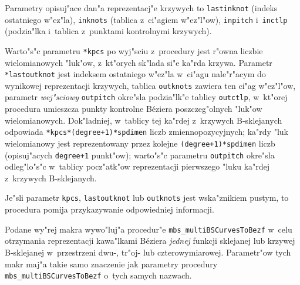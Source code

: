 Parametry opisuj"ace dan"a reprezentacj"e krzywych to \texttt{lastinknot}
(indeks ostatniego w"ez"la), \texttt{inknots} (tablica z~ci"agiem w"ez"l"ow),
\texttt{inpitch} i~\texttt{inctlp} (podzia"lka i~tablica z~punktami
kontrolnymi krzywych).

Warto"s"c parametru \texttt{*kpcs} po wyj"sciu z~procedury jest r"owna
liczbie wielomianowych "luk"ow, z~kt"orych sk"lada si"e ka"rda krzywa.
Parametr \texttt{*lastoutknot} jest indeksem ostatniego w"ez"la w~ci"agu
nale"r"acym do wynikowej reprezentacji krzywych, tablica \texttt{outknots}
zawiera ten ci"ag w"ez"l"ow, parametr \emph{wej"sciowy} \texttt{outpitch}
okre"sla podzia"lk"e tablicy \texttt{outctlp}, w~kt"orej procedura umieszcza
punkty kontrolne B\'{e}ziera poszczeg"olnych "luk"ow wielomianowych.
Dok"ladniej, w~tablicy tej ka"rdej z~krzywych B-sklejanych odpowiada
\texttt{*kpcs*(degree+1)*spdimen} liczb zmiennopozycyjnych; ka"rdy "luk
wielomianowy jest reprezentowany przez kolejne \texttt{(degree+1)*spdimen}
liczb (opisuj"acych \texttt{degree+1} punkt"ow); warto"s"c parametru
\texttt{outpitch} okre"sla odleg"lo"s"c w~tablicy pocz"atk"ow reprezentacji
pierwszego "luku ka"rdej z~krzywych B-sklejanych.

Je"sli parametr \texttt{kpcs}, \texttt{lastoutknot} lub \texttt{outknots}
jest wska"znikiem pustym, to procedura pomija przykazywanie odpowiedniej
informacji.


\vspace{\bigskipamount}
\begin{sloppypar}
Podane wy"rej makra wywo"luj"a procedur"e \texttt{mbs\_multiBSCurvesToBezf}
w~celu otrzymania reprezentacji kawa"lkami B\'{e}ziera \emph{jednej} funkcji
sklejanej lub krzywej \mbox{B-sklejanej} w~przestrzeni dwu-, tr"oj- lub
czterowymiarowej. Parametr"ow tych makr maj"a takie samo znaczenie jak
parametry procedury \texttt{mbs\_multiBSCurvesToBezf} o~tych samych nazwach. 
\end{sloppypar}



